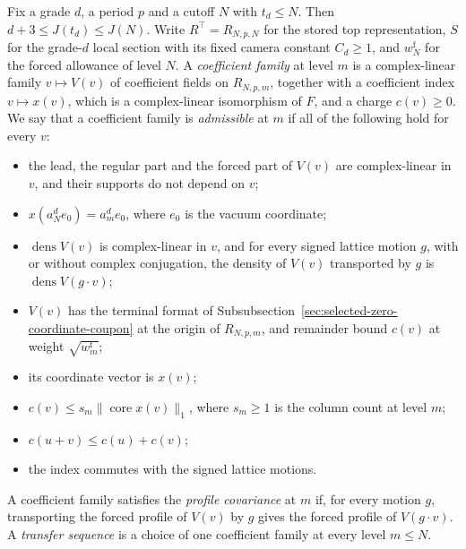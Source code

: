 Fix a grade $d$, a period $p$ and a cutoff $N$ with $t_d\le N$. Then
$d+3\le J(t_d)\le J(N)$. Write $R^\top=R_{N,p,N}$ for the stored top
representation, $S$ for the grade-$d$ local section with its fixed camera
constant $C_d\ge1$, and $w^{\mathrm f}_N$ for the forced allowance of
level $N$. A \emph{coefficient family} at level $m$ is a complex-linear family
$v\mapsto V(v)$ of coefficient fields on $R_{N,p,m}$, together with a
coefficient index $v\mapsto x(v)$, which is a complex-linear
isomorphism of $F$, and a charge $c(v)\ge0$. We say that a coefficient family is
\emph{admissible} at $m$ if all of the following hold for every $v$:
\begin{itemize}
\item the lead, the regular part and the forced part of $V(v)$ are
  complex-linear in $v$, and their supports do not depend on $v$;
\item $x(a_N^de_0)=a_m^de_0$, where $e_0$ is the vacuum coordinate;
\item $\operatorname{dens}V(v)$ is complex-linear in $v$, and for every
  signed lattice motion $g$, with or without complex conjugation, the
  density of $V(v)$ transported by $g$ is $\operatorname{dens}V(g\cdot v)$;
\item $V(v)$ has the terminal format of
  Subsubsection~\ref{sec:selected-zero-coordinate-coupon} at the origin of
  $R_{N,p,m}$, and remainder bound $c(v)$ at weight
  $\sqrt{w^{\mathrm f}_m}$;
\item its coordinate vector is $x(v)$;
\item $c(v)\le s_m\|\operatorname{core}x(v)\|_1$, where $s_m\ge1$ is the
  column count at level $m$;
\item $c(u+v)\le c(u)+c(v)$;
\item the index commutes with the signed lattice motions.
\end{itemize}
A coefficient family satisfies the \emph{profile covariance} at $m$ if, for every
motion $g$, transporting the forced profile of $V(v)$ by $g$ gives the
forced profile of $V(g\cdot v)$. A \emph{transfer sequence} is a choice of one coefficient family
at every level $m\le N$.

